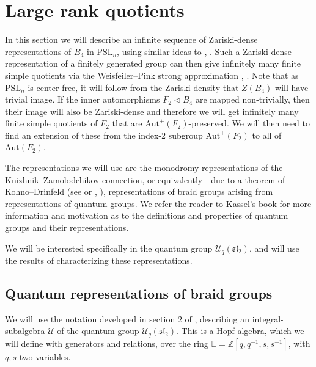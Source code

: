\documentclass[letterpaper]{amsart}
\begin{document}
\section{Large rank quotients}
In this section we will describe an infinite sequence of Zariski-dense representations of $B_4$ in $\mathrm{PSL}_n$, using similar ideas to \cite{chen2025finite}, \cite{funar2018profinite}. Such a Zariski-dense representation of a finitely generated group can then give infinitely many finite simple quotients via the Weisfeiler--Pink strong approximation \cite{weisfeiler1984strong}, \cite{pink2000strong}.
Note that as $\mathrm{PSL}_n$ is center-free, it will follow from the Zariski-density that $Z(B_4)$ will have trivial image. If the inner automorphisms $F_2 \lhd B_4$ are mapped non-trivially, then their image will also be Zariski-dense and therefore we will get infinitely many finite simple quotients of $F_2$ that are $\mathrm{Aut}^+(F_2)$-preserved.
We will then need to find an extension of these from the index-$2$ subgroup $\mathrm{Aut}^+(F_2)$ to all of $\mathrm{Aut}(F_2)$.

The representations we will use are the monodromy representations of the Knizhnik--Zamolodchikov connection, or equivalently - due to a theorem of Kohno--Drinfeld (see \cite{kohno1987monodromy} or \cite{abad2014introduction}, \cite{kassel2012quantum}), representations of braid groups arising from representations of quantum groups. We refer the reader to Kassel's book \cite{kassel2012quantum} for more information and motivation as to the definitions and properties of quantum groups and their representations.

We will be interested specifically in the quantum group $\mathcal{U}_q(\mathfrak{sl}_2)$, and will use the results of \cite{jackson2011lawrence} characterizing these representations.

\subsection{Quantum representations of braid groups}
We will use the notation developed in section $2$ of \cite{jackson2011lawrence}, describing an integral-subalgebra $\mathcal{U}$ of the quantum group $\mathcal{U}_q(\mathfrak{sl}_2)$. This is a Hopf-algebra, which we will define with generators and relations, over the ring $\mathbb{L} = \mathbb{Z}[q,q^{-1},s,s^{-1}]$, with $q,s$ two variables.
\end{document}
